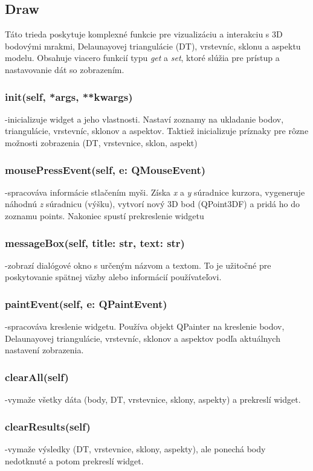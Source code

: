 \documentclass[12pt]{article}
\begin{document}
\subsection*{Draw}
Táto trieda poskytuje komplexné funkcie pre vizualizáciu a interakciu s 3D bodovými mrakmi,  Delaunayovej triangulácie (DT), vrstevníc, sklonu a aspektu modelu. Obsahuje viacero funkcií typu \textit{get} a \textit{set}, ktoré slúžia pre prístup a nastavovanie dát so zobrazením. 
\subsubsection*{\textunderscore\textunderscore init\textunderscore \textunderscore(self, *args, **kwargs)}
\noindent-inicializuje widget a jeho vlastnosti. Nastaví zoznamy na ukladanie bodov, triangulácie, vrstevníc, sklonov a aspektov. Taktiež inicializuje príznaky pre rôzne možnosti zobrazenia (DT, vrstevnice, sklon, aspekt) 
\subsubsection*{mousePressEvent(self, e: QMouseEvent)}
\noindent-spracováva informácie stlačením myši. Získa \textit{x} a \textit{y} súradnice kurzora, vygeneruje náhodnú \textit{z} súradnicu (výšku), vytvorí nový 3D bod (QPoint3DF) a pridá ho do zoznamu points. Nakoniec spustí prekreslenie widgetu
\subsubsection*{messageBox(self, title: str, text: str)}
\noindent-zobrazí dialógové okno s určeným názvom a textom. To je užitočné pre poskytovanie spätnej väzby alebo informácií používateľovi.
\subsubsection*{paintEvent(self, e: QPaintEvent)}
\noindents-spracováva kreslenie widgetu. Používa objekt QPainter na kreslenie bodov, Delaunayovej triangulácie, vrstevníc, sklonov a aspektov podľa aktuálnych nastavení zobrazenia.
\subsubsection*{clearAll(self)}
\noindent-vymaže všetky dáta (body, DT, vrstevnice, sklony, aspekty) a prekreslí widget.
\subsubsection*{clearResults(self)}
\noindent-vymaže výsledky (DT, vrstevnice, sklony, aspekty), ale ponechá body nedotknuté a potom prekreslí widget.
\end{document}
